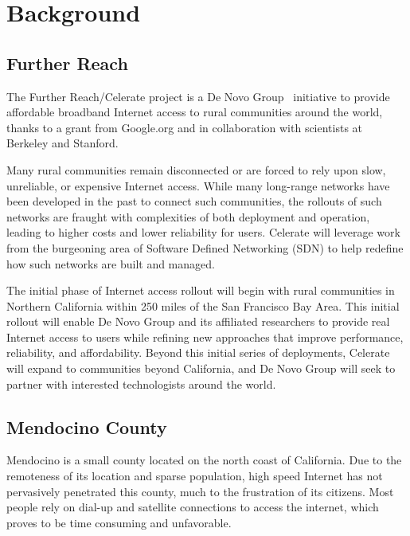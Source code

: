 
\section{Background}
\label{sec:background}

\subsection{Further Reach}
\label{sec:further-reach}


The Further Reach/Celerate project is a De Novo Group~\cite{denovo} initiative
to provide affordable broadband Internet access to rural communities around the
world, thanks to a grant from Google.org and in collaboration with scientists at
Berkeley and Stanford.

Many rural communities remain disconnected or are forced to rely upon slow,
unreliable, or expensive Internet access. While many long-range networks have
been developed in the past to connect such communities, the rollouts of such
networks are fraught with complexities of both deployment and operation, leading
to higher costs and lower reliability for users. Celerate will leverage work
from the burgeoning area of Software Defined Networking (SDN) to help redefine
how such networks are built and managed.

The initial phase of Internet access rollout will begin with rural communities
in Northern California within 250 miles of the San Francisco Bay Area. This
initial rollout will enable De Novo Group and its affiliated researchers to
provide real Internet access to users while refining new approaches that improve
performance, reliability, and affordability. Beyond this initial series of
deployments, Celerate will expand to communities beyond California, and De Novo
Group will seek to partner with interested technologists around the world.

\subsection{Mendocino County}
\label{sec:mendocino-county}

Mendocino is a small county located on the north coast of California. Due to
the remoteness of its location and sparse population, high speed Internet has
not pervasively penetrated this county, much to the frustration of its citizens.
Most people rely on dial-up and satellite connections to access the internet, which proves to be time consuming and unfavorable.

